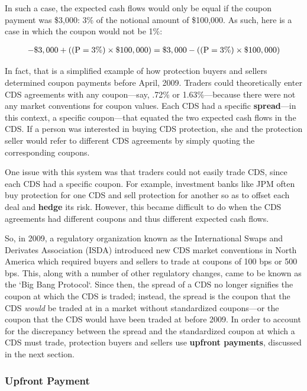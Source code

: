 \documentclass{jss}
\begin{document}
In such a case, the expected cash flows would only be equal if the coupon payment was \$3,000: 3\% of the notional amount of \$100,000. As such, here is a case in which the coupon would not be 1\%:

\begin{equation}
 \begin{aligned}
   {\rm - \$3,000 + ((P = 3\%) \times \$100,000) = \$3,000 - ((P = 3\%) \times \$100,000)}
    \end{aligned}
\end{equation}

In fact, that is a simplified example of how protection buyers and sellers determined coupon payments before April, 2009. Traders could theoretically enter CDS agreements with any coupon---say, .72\% or 1.63\%---because there were not any market conventions for coupon values. Each CDS had a specific \textbf{spread}---in this context, a specific coupon---that equated the two expected cash flows in the CDS. If a person was interested in buying CDS protection, she and the protection seller would refer to different CDS agreements by simply quoting the corresponding coupons.

One issue with this system was that traders could not easily trade CDS, since each CDS had a specific coupon.
For example, investment banks like JPM often buy protection for one CDS and sell protection for another so as to offset each deal and \textbf{hedge} its risk. However, this became difficult to do when the CDS agreements had different coupons and thus different expected cash flows.

So, in 2009, a regulatory organization known as the International Swaps and Derivates Association (ISDA) 
introduced new CDS market conventions in North America which required buyers and sellers to trade at coupons of 100 bps or 500 bps. This, along with a number of other regulatory changes, came to be known as the `Big Bang Protocol`. Since then, the spread of a CDS no longer signifies the coupon at which the CDS is traded; instead, the spread is the coupon that the CDS \emph{would} be traded at in a market without standardized coupons---or the coupon that the CDS would have been traded at before 2009. In order to account for the discrepancy between the spread and the standardized coupon at which a CDS must trade, protection buyers and sellers use \textbf{upfront payments}, discussed in the next section.

\subsubsection{Upfront Payment}
\label{sec:Upfront}
\end{document}

